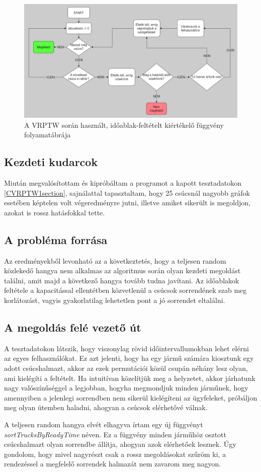 \begin{figure}[ht!]
	\centering
	\includegraphics[width=150mm, keepaspectratio]{figures/timeWindow.drawio.png}
	\caption{A VRPTW során használt, időablak-feltételt kiértékelő függvény folyamatábrája}
	\label{fig:VRPTW_chart}
\end{figure}

\subsection{Kezdeti kudarcok}
Miután megvalósítottam és kipróbáltam a programot a kapott tesztadatokon \ref{CVRPTW1section}, sajnálattal tapasztaltam, hogy 25 csúcsnál nagyobb gráfok esetében képtelen volt végeredményre jutni, illetve amiket sikerült is megoldjon, azokat is rossz hatásfokkal tette.

\subsection{A probléma forrása} Az eredményekből levonható az a következtetés, hogy a teljesen random közlekedő hangya nem alkalmas az algoritmus során olyan kezdeti megoldást találni, amit majd a következő hangya tovább tudna javítani. Az időablakok feltétele a kapacitással ellentétben közvetlenül a csúcsok sorrendének szab meg korlátozást, vagyis gyakorlatilag lehetetlen pont a jó sorrendet eltalálni. 

\subsection{A megoldás felé vezető út}
A tesztadatokon látszik, hogy viszonylag rövid időintervallumokban lehet elérni az egyes felhasználókat. Ez azt jelenti, hogy ha egy jármű számára kiosztunk egy adott csúcshalmazt, akkor az ezek permutációi közül csupán néhány lesz olyan, ami kielégíti a feltételt. Ha intuitívan közelítjük meg a helyzetet, akkor járhatunk nagy valószínűséggel a legjobban, hogyha megmondjuk minden járműnek, hogy amennyiben a jelenlegi sorrendben nem sikerül kielégíteni az ügyfeleket, próbáljon meg olyan ütemben haladni, ahogyan a csúcsok elérhetővé válnak.

A teljesen random hangya elvét elhagyva írtam egy új függvényt \textit{sortTrucksByReadyTime} néven. Ez a függvény minden járműhöz osztott csúcshalmazt olyan sorrendbe állítja, ahogyan azok elérhetőek lesznek. Úgy gondolom, hogy mivel nagyrészt csak a rossz megoldásokat szűröm ki, a rendezéssel a megfelelő sorrendek halmazát nem zavarom meg nagyon.
